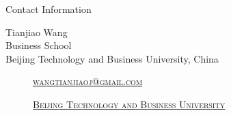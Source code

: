 \documentclass[
 size=14pt,
 paper=smartboard,  %
 mode=present, 		%
 display=slides, 	%
 style=tuliplab,  	%
 pauseslide,
 fleqn,leqno]{powerdot}
\begin{document}
\begin{wideslide}[toc=,bm=]{Contact Information}
\centering
{}
\twocolumn[
lcolwidth=0.35\linewidth,
rcolwidth=0.65\linewidth
]
{
}
{
Tianjiao Wang\\
Business School\\
Beijing Technology and Business University, China
\begin{description}
 \item[\textcolor{orange}{\faEnvelope}] \href{mailto:Wangtianjiaoj@gmail.com}
 {\textsc{\footnotesize{wangtianjiaoj@gmail.com}}}

 \item[\textcolor{orange}{\faHome}] \href{http://www.tulip.org.au}
 {\textsc{\footnotesize{Beijing Technology and Business University}}}
\end{description}
}
\end{wideslide}
\end{document}
